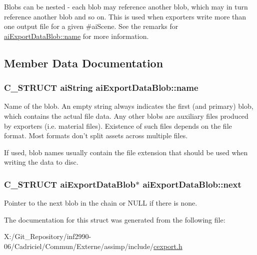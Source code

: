 Blobs can be nested -\/ each blob may reference another blob, which may in turn reference another blob and so on. This is used when exporters write more than one output file for a given \#ai\-Scene. See the remarks for \hyperlink{structai_export_data_blob_af7f006ac5ad818c0d81d520a84f74c3e}{ai\-Export\-Data\-Blob\-::name} for more information. 

\subsection{Member Data Documentation}
\hypertarget{structai_export_data_blob_af7f006ac5ad818c0d81d520a84f74c3e}{
\subsubsection[{name}]{\setlength{\rightskip}{0pt plus 5cm}C\-\_\-\-S\-T\-R\-U\-C\-T {\bf ai\-String} ai\-Export\-Data\-Blob\-::name}}\label{structai_export_data_blob_af7f006ac5ad818c0d81d520a84f74c3e}
Name of the blob. An empty string always indicates the first (and primary) blob, which contains the actual file data. Any other blobs are auxiliary files produced by exporters (i.\-e. material files). Existence of such files depends on the file format. Most formats don't split assets across multiple files.

If used, blob names usually contain the file extension that should be used when writing the data to disc. \hypertarget{structai_export_data_blob_a3e98fa760f45983ff1bccec6715f3817}{
\subsubsection[{next}]{\setlength{\rightskip}{0pt plus 5cm}C\-\_\-\-S\-T\-R\-U\-C\-T {\bf ai\-Export\-Data\-Blob}$\ast$ ai\-Export\-Data\-Blob\-::next}}\label{structai_export_data_blob_a3e98fa760f45983ff1bccec6715f3817}
Pointer to the next blob in the chain or N\-U\-L\-L if there is none. 

The documentation for this struct was generated from the following file\-:\begin{DoxyCompactItemize}
\item 
X\-:/\-Git\-\_\-\-Repository/inf2990-\/06/\-Cadriciel/\-Commun/\-Externe/assimp/include/\hyperlink{cexport_8h}{cexport.\-h}\end{DoxyCompactItemize}
